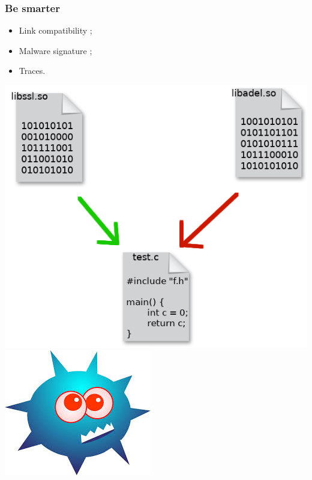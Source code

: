 \documentclass[11pt]{beamer}
\begin{document}
\begin{frame}
    \frametitle{Be smarter}

    \begin{block}{}
    \begin{itemize}
        \item Link compatibility ;
        \item Malware signature ;
        \item Traces.
    \end{itemize}
    \end{block}
    \begin{center}
        \includegraphics[scale=0.2]{link.png}
    \includegraphics[scale=0.4]{malware.jpeg}

\end{center}
\end{frame}
\end{document}
